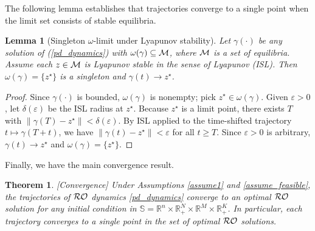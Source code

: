 \documentclass[journal,twoside,web]{ieeecolor}
\newcommand{\rev}[1]{\textcolor{revisionblue}{#1}}
\newtheorem{theorem}{Theorem}
\newtheorem{lemma}{Lemma}
\begin{document}
\rev{The following lemma establishes that trajectories converge to a single point when the limit set consists of stable equilibria.}
\begin{lemma}[\rev{Singleton $\omega$-limit under Lyapunov stability}]\label{singleton_omega}
\rev{Let $\gamma(\cdot)$ be any solution of (\ref{pd_dynamics}) with $\omega(\gamma)\subseteq{\cal M}$, where ${\cal M}$ is a set of equilibria.
Assume each $z\in{\cal M}$ is Lyapunov stable in the sense of Lyapunov (ISL).
Then $\omega(\gamma)=\{z^\star\}$ is a singleton and $\gamma(t)\to z^\star$.}
\end{lemma}
\begin{proof}
\rev{Since $\gamma(\cdot)$ is bounded, $\omega(\gamma)$ is nonempty; pick $z^\star\in\omega(\gamma)$.
Given $\varepsilon>0$, let $\delta(\varepsilon)$ be the ISL radius at $z^\star$.
Because $z^\star$ is a limit point, there exists $T$ with $\|\gamma(T)-z^\star\|<\delta(\varepsilon)$.
By ISL applied to the time-shifted trajectory $t\mapsto \gamma(T+t)$, we have $\|\gamma(t)-z^\star\|<\varepsilon$ for all $t\ge T$.
Since $\varepsilon>0$ is arbitrary, $\gamma(t)\to z^\star$ and $\omega(\gamma)=\{z^\star\}$.}
\end{proof}

Finally, we have the main convergence result.
\begin{theorem}\label{maintheorem}[Convergence]
\rev{Under Assumptions \ref{assume1} and \ref{assume_feasible}, the trajectories of ${\cal RO}$ dynamics \eqref{pd_dynamics} converge to an optimal ${\cal RO}$ solution for any initial condition in $\mathbb{S}=\mathbb{R}^n\times \mathbb{R}^N_{+}\times \mathbb{R}^M\times \mathbb{R}^K_+$. In particular, each trajectory converges to a single point in the set of optimal ${\cal RO}$ solutions.}
\end{theorem}
\end{document}
